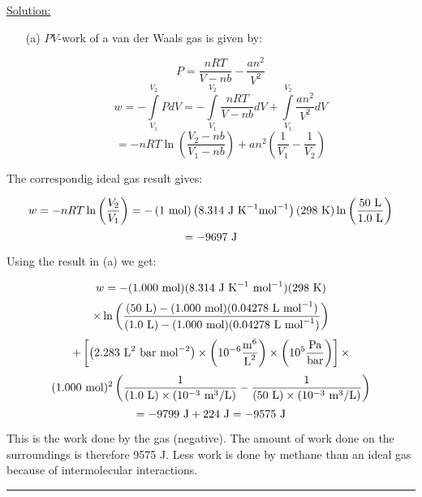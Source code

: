 \noindent
\underline{Solution:}\\

\begin{itemize}

\item[(a)] $PV$-work of a van der Waals gas is given by:

$$P = \frac{nRT}{V - nb} - \frac{an^2}{V^2}$$
$$w = -\int\limits_{V_1}^{V_2}PdV = -\int\limits_{V_1}^{V_2}\frac{nRT}{V - nb}dV + \int\limits_{V_1}^{V_2}\frac{an^2}{V^2}dV$$
$$ = -nRT\ln\left(\frac{V_2 - nb}{V_1 - nb}\right) + an^2\left(\frac{1}{V_1} - \frac{1}{V_2}\right)$$
\end{itemize}

\item[(b)] The correspondig ideal gas result gives:

$$w = -nRT\ln\left(\frac{V_2}{V_1}\right) = -\left(1\textnormal{ mol}\right)\left(8.314\textnormal{ J K}^{-1}\textnormal{mol}^{-1}\right)\left(298\textnormal{ K}\right)\ln\left(\frac{50\textnormal{ L}}{1.0\textnormal{ L}}\right)$$
$$ = -9697\textnormal{ J}$$

\item[(c)] Using the result in (a) we get:

$$w = -(1.000\textnormal{ mol})(8.314\textnormal{ J K}^{-1}\textnormal{ mol}^{-1})(298\textnormal{ K})$$
$$\times\ln\left(\frac{(50\textnormal{ L}) - (1.000\textnormal{ mol})(0.04278\textnormal{ L mol}^{-1})}{(1.0\textnormal{ L}) - (1.000\textnormal{ mol})(0.04278\textnormal{ L mol}^{-1})}\right)$$
$$ + \left[\left(2.283\textnormal{ L}^2\textnormal{ bar mol}^{-2}\right)\times\left(10^{-6}\frac{\textnormal{m}^6}{\textnormal{L}^2}\right)\times\left(10^5\frac{\textnormal{Pa}}{\textnormal{bar}}\right)\right]\times$$
$$(1.000\textnormal{ mol})^2\left(\frac{1}{(1.0\textnormal{ L})\times(10^{-3}\textnormal{ m}^3/\textnormal{L})} - \frac{1}{(50\textnormal{ L})\times(10^{-3}\textnormal{ m}^3/\textnormal{L})}\right)$$
$$ = -9799\textnormal{ J} + 224\textnormal{ J} = -9575\textnormal{ J}$$

This is the work done by the gas (negative). The amount of work done on the surroundings is therefore 9575 J. Less work is done by methane than an ideal gas because of intermolecular interactions.

\hrule\vspace{0.5cm}
